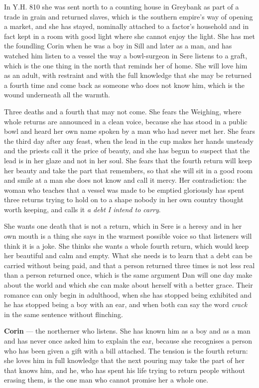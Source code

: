 \documentclass{design/chronicle}
\begin{document}
{In Y.H. 810 she was sent north to a counting house in Greybank as part of a trade in grain and returned slaves, which is the southern empire’s way of opening a market, and she has stayed, nominally attached to a factor’s household and in fact kept in a room with good light where she cannot enjoy the light. She has met the foundling Corin when he was a boy in Sill and later as a man, and has watched him listen to a vessel the way a bowl-surgeon in Sere listens to a graft, which is the one thing in the north that reminds her of home. She will love him as an adult, with restraint and with the full knowledge that she may be returned a fourth time and come back as someone who does not know him, which is the wound underneath all the warmth.

Three deaths and a fourth that may not come. She fears the Weighing, where whole returns are announced in a clean voice, because she has stood in a public bowl and heard her own name spoken by a man who had never met her. She fears the third day after any feast, when the lead in the cup makes her hands unsteady and the priests call it the price of beauty, and she has begun to suspect that the lead is in her glaze and not in her soul. She fears that the fourth return will keep her beauty and take the part that remembers, so that she will sit in a good room and smile at a man she does not know and call it mercy. Her contradiction: the woman who teaches that a vessel was made to be emptied gloriously has spent three returns trying to hold on to a shape nobody in her own country thought worth keeping, and calls it \emph{a debt I intend to carry}.

She wants one death that is not a return, which in Sere is a heresy and in her own mouth is a thing she says in the warmest possible voice so that listeners will think it is a joke. She thinks she wants a whole fourth return, which would keep her beautiful and calm and empty. What she needs is to learn that a debt can be carried without being paid, and that a person returned three times is not less real than a person returned once, which is the same argument Dan will one day make about the world and which she can make about herself with a better grace. Their romance can only begin in adulthood, when she has stopped being exhibited and he has stopped being a boy with an ear, and when both can say the word \emph{crack} in the same sentence without flinching.

\textbf{Corin} — the northerner who listens. She has known him as a boy and as a man and has never once asked him to explain the ear, because she recognises a person who has been given a gift with a bill attached. The tension is the fourth return: she loves him in full knowledge that the next pouring may take the part of her that knows him, and he, who has spent his life trying to return people without erasing them, is the one man who cannot promise her a whole one.

}
\end{document}
